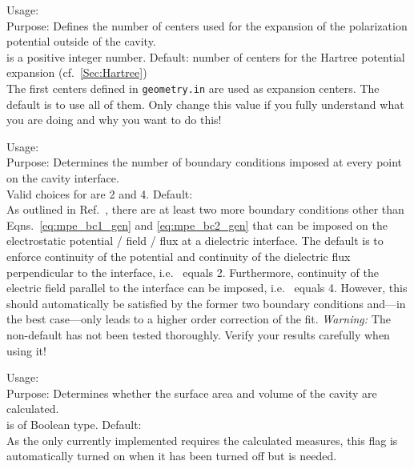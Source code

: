 {
  \noindent
  Usage:   \\[1.0ex] 
  Purpose: Defines the number of centers used 
    for the expansion of the polarization potential 
    outside of the cavity. \\[1.0ex]
   is a positive integer number. 
    Default: number of centers for the Hartree 
    potential expansion (cf.~\ref{Sec:Hartree}) \\
}
The first  centers defined in 
\texttt{geometry.in} are used as expansion centers. 
The default is to use all of them. Only change this 
value if you fully understand what you are doing and 
why you want to do this! 


{
  \noindent
  Usage:   \\[1.0ex] 
  Purpose: Determines the number of boundary conditions 
    imposed at every point on the cavity interface. \\[1.0ex]
  Valid choices for  are 2 and 4. Default:  \\
}
As outlined in Ref.~\cite{Sinstein2017_MPE}, there are at least 
two more boundary conditions other than Eqns.~\ref{eq:mpe_bc1_gen} 
and \ref{eq:mpe_bc2_gen} that can be imposed on the electrostatic 
potential / field / flux at a dielectric interface. 
The default is to enforce continuity of the potential and 
continuity of the dielectric flux perpendicular to the interface, 
i.e.~ equals 2. 
Furthermore, continuity of the electric field parallel to the 
interface can be imposed, i.e.~ equals 4. 
However, this should automatically be satisfied by the former 
two boundary conditions and---in the best case---only leads to 
a higher order correction of the fit. 
\emph{Warning:} The non-default has not been tested thoroughly. 
Verify your results carefully when using it! 


{
  \noindent
  Usage:   \\[1.0ex] 
  Purpose: Determines whether the surface area and volume 
    of the cavity are calculated. \\[1.0ex]
   is of Boolean type. Default:  \\
}
As the only currently implemented  
 requires 
the calculated measures, this flag is automatically turned on 
when it has been turned off but is needed. 

